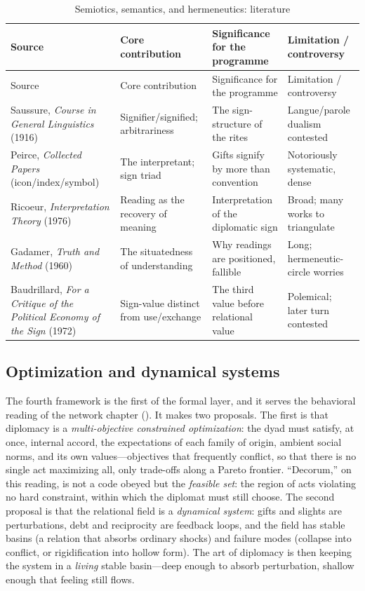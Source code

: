 \goldrule
\footnotesize
\begin{longtable}{Y Y Y Y}
\caption{Semiotics, semantics, and hermeneutics: literature}\label{p07:tab:lit-semiotics}\\
\toprule
{}
Source & Core contribution & Significance for the programme & Limitation / controversy \\
\midrule
\endfirsthead
{}
Source & Core contribution & Significance for the programme & Limitation / controversy \\
\midrule
\endhead
Saussure, \emph{Course in General Linguistics} (1916) & Signifier/signified; arbitrariness & The sign-structure of the rites & Langue/parole dualism contested \\
Peirce, \emph{Collected Papers} (icon/index/symbol) & The interpretant; sign triad & Gifts signify by more than convention & Notoriously systematic, dense \\
Ricoeur, \emph{Interpretation Theory} (1976) & Reading as the recovery of meaning & Interpretation of the diplomatic sign & Broad; many works to triangulate \\
Gadamer, \emph{Truth and Method} (1960) & The situatedness of understanding & Why readings are positioned, fallible & Long; hermeneutic-circle worries \\
Baudrillard, \emph{For a Critique of the Political Economy of the Sign} (1972) & Sign-value distinct from use/exchange & The third value before relational value & Polemical; later turn contested \\
\bottomrule
\end{longtable}

\subsection{Optimization and dynamical systems}
The fourth framework is the first of the formal layer, and it serves the behavioral reading of the network chapter (). It makes two proposals. The first is that diplomacy is a \emph{multi-objective constrained optimization}: the dyad must satisfy, at once, internal accord, the expectations of each family of origin, ambient social norms, and its own values---objectives that frequently conflict, so that there is no single act maximizing all, only trade-offs along a Pareto frontier. ``Decorum,'' on this reading, is not a code obeyed but the \emph{feasible set}: the region of acts violating no hard constraint, within which the diplomat must still choose. The second proposal is that the relational field is a \emph{dynamical system}: gifts and slights are perturbations, debt and reciprocity are feedback loops, and the field has stable basins (a relation that absorbs ordinary shocks) and failure modes (collapse into conflict, or rigidification into hollow form). The art of diplomacy is then keeping the system in a \emph{living} stable basin---deep enough to absorb perturbation, shallow enough that feeling still flows.

